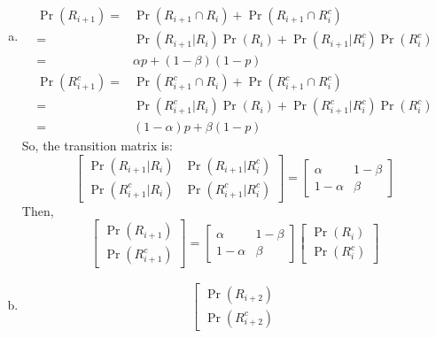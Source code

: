 \documentclass[14pt]{elegantbook}
\begin{document}
    \begin{solution}
        \begin{enumerate}[(a)]
            \item 
            \begin{align*}
                \Pr(R_{i+1})=&\Pr(R_{i+1}\cap R_i)+\Pr(R_{i+1}\cap R_i^c)\\
                =&\Pr(R_{i+1}|R_i)\Pr(R_i)+\Pr(R_{i+1}|R_i^c)\Pr(R_i^c)\\
                =&\alpha p+(1-\beta)(1-p)
            \end{align*}
            \begin{align*}
                \Pr(R_{i+1}^c)=&\Pr(R_{i+1}^c\cap R_i)+\Pr(R_{i+1}^c\cap R_i^c)\\
                =&\Pr(R_{i+1}^c|R_i)\Pr(R_i)+\Pr(R_{i+1}^c|R_i^c)\Pr(R_i^c)\\
                =&(1-\alpha) p+\beta(1-p)
            \end{align*}
            So, the transition matrix is: 
            \[\begin{bmatrix}
                \Pr(R_{i+1}|R_i)&\Pr(R_{i+1}|R_i^c)\\
                \Pr(R_{i+1}^c|R_i)&\Pr(R_{i+1}^c|R_i^c)
            \end{bmatrix}=\begin{bmatrix}
                \alpha&1-\beta\\
                1-\alpha&\beta
            \end{bmatrix}\]
            Then, \[\left[
                \begin{matrix}
                    \Pr(R_{i+1})\\
                    \Pr(R_{i+1}^c)
                \end{matrix}\right]=\begin{bmatrix}
                    \alpha&1-\beta\\
                    1-\alpha&\beta
                \end{bmatrix}\begin{bmatrix}
                    \Pr(R_i)\\
                    \Pr(R_i^c)
                \end{bmatrix}
            \]
            \item \begin{align*}
                \left[\begin{matrix}
                    \Pr(R_{i+2})\\
                    \Pr(R_{i+2}^c)

\end{matrix}
\end{align*}
\end{enumerate}
\end{solution}
\end{document}
